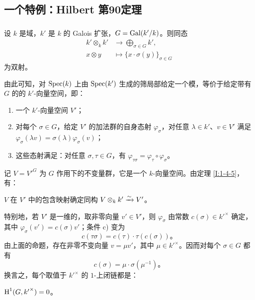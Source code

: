 \subsection{一个特例：Hilbert 第90定理}\label{I:1-5}
\subsubsection{}\label{I:1-5-1}
设 $k$ 是域，$k'$ 是 $k$ 的 Galois 扩张，$G=\operatorname{Gal}(k'/k)$。则同态
\begin{align*}
 k'\otimes_kk'&\longrightarrow\bigoplus_{\sigma\in G}k',\\
 x\otimes y&\longmapsto\{x\cdot\sigma(y)\}_{\sigma\in G}
\end{align*}
为双射。

由此可知，对 $\operatorname{Spec}(k)$ 上由 $\operatorname{Spec}(k')$ 生成的筛局部给定一个模，等价于给定带有 $G$ 的的 $k'$-向量空间，即：
\begin{enumerate}[\indent a)]
\item 一个 $k'$-向量空间 $V'$；
\item 对每个 $\sigma\in G$，给定 $V'$ 的加法群的自身态射 $\varphi_\sigma$，对任意 $\lambda\in k'$、$v\in V'$ 满足 $\varphi_\sigma(\lambda v)=\sigma(\lambda)\varphi_\sigma(v)$；
\item 这些态射满足：对任意 $\sigma,\tau\in G$，有 $\varphi_{\tau\sigma}=\varphi_\tau\circ\varphi_\sigma$。
\end{enumerate}

记 $V={V'}^G$ 为 $G$ 作用下的不变量群，它是一个 $k$-向量空间。由定理 \ref{I:1-4-5}，有：
\begin{proposition}\label{I:1-5-2}
$V$ 在 $V'$ 中的包含映射确定同构 $V\otimes_kk'\xrightarrow\sim V'$。
\end{proposition}

特别地，若 $V'$ 是一维的，取非零向量 $v'\in V'$，则 $\varphi_\sigma$ 由常数 $c(\sigma)\in{k'}^\times$ 确定，其中 $\varphi_\sigma(v')=c(\sigma)v'$；条件 c) 变为
\[
 c(\tau\sigma)=c(\tau)\cdot\tau(c(\sigma))\text{。}
\]
由上面的命题，存在非零不变向量 $v=\mu v'$，其中 $\mu\in{k'}^\times$。因而对每个 $\sigma\in G$ 都有
\[
 c(\sigma)=\mu\cdot\sigma(\mu^{-1})\text{。}
\]
换言之，每个取值于 ${k'}^\times$ 的 $1$-上闭链都是：
\begin{corollary}\label{I:1-5-3}
$\operatorname{H}^1(G,{k'}^\times)=0$。
\end{corollary}

